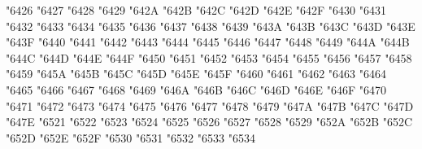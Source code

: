 {\Uchar\jis"6426 %
\Uchar\jis"6427 %
\Uchar\jis"6428 %
\Uchar\jis"6429 %
\Uchar\jis"642A %
\Uchar\jis"642B %
\Uchar\jis"642C %
\Uchar\jis"642D %
\Uchar\jis"642E %
\Uchar\jis"642F %
\Uchar\jis"6430 %
\Uchar\jis"6431 %
\Uchar\jis"6432 %
\Uchar\jis"6433 %
\Uchar\jis"6434 %
\Uchar\jis"6435 %
\Uchar\jis"6436 %
\Uchar\jis"6437 %
\Uchar\jis"6438 %
\Uchar\jis"6439 %
\Uchar\jis"643A %
\Uchar\jis"643B %
\Uchar\jis"643C %
\Uchar\jis"643D %
\Uchar\jis"643E %
\Uchar\jis"643F %
\Uchar\jis"6440 %
\Uchar\jis"6441 %
\Uchar\jis"6442 %
\Uchar\jis"6443 %
\Uchar\jis"6444 %
\Uchar\jis"6445 %
\Uchar\jis"6446 %
\Uchar\jis"6447 %
\Uchar\jis"6448 %
\Uchar\jis"6449 %
\Uchar\jis"644A %
\Uchar\jis"644B %
\Uchar\jis"644C %
\Uchar\jis"644D %
\Uchar\jis"644E %
\Uchar\jis"644F %
\Uchar\jis"6450 %
\Uchar\jis"6451 %
\Uchar\jis"6452 %
\Uchar\jis"6453 %
\Uchar\jis"6454 %
\Uchar\jis"6455 %
\Uchar\jis"6456 %
\Uchar\jis"6457 %
\Uchar\jis"6458 %
\Uchar\jis"6459 %
\Uchar\jis"645A %
\Uchar\jis"645B %
\Uchar\jis"645C %
\Uchar\jis"645D %
\Uchar\jis"645E %
\Uchar\jis"645F %
\Uchar\jis"6460 %
\Uchar\jis"6461 %
\Uchar\jis"6462 %
\Uchar\jis"6463 %
\Uchar\jis"6464 %
\Uchar\jis"6465 %
\Uchar\jis"6466 %
\Uchar\jis"6467 %
\Uchar\jis"6468 %
\Uchar\jis"6469 %
\Uchar\jis"646A %
\Uchar\jis"646B %
\Uchar\jis"646C %
\Uchar\jis"646D %
\Uchar\jis"646E %
\Uchar\jis"646F %
\Uchar\jis"6470 %
\Uchar\jis"6471 %
\Uchar\jis"6472 %
\Uchar\jis"6473 %
\Uchar\jis"6474 %
\Uchar\jis"6475 %
\Uchar\jis"6476 %
\Uchar\jis"6477 %
\Uchar\jis"6478 %
\Uchar\jis"6479 %
\Uchar\jis"647A %
\Uchar\jis"647B %
\Uchar\jis"647C %
\Uchar\jis"647D %
\Uchar\jis"647E %
\Uchar\jis"6521 %
\Uchar\jis"6522 %
\Uchar\jis"6523 %
\Uchar\jis"6524 %
\Uchar\jis"6525 %
\Uchar\jis"6526 %
\Uchar\jis"6527 %
\Uchar\jis"6528 %
\Uchar\jis"6529 %
\Uchar\jis"652A %
\Uchar\jis"652B %
\Uchar\jis"652C %
\Uchar\jis"652D %
\Uchar\jis"652E %
\Uchar\jis"652F %
\Uchar\jis"6530 %
\Uchar\jis"6531 %
\Uchar\jis"6532 %
\Uchar\jis"6533 %
\Uchar\jis"6534 %
}
